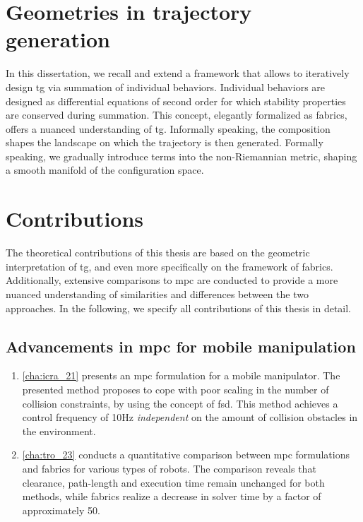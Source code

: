 \section{Geometries in trajectory generation}
\label{sec:geometries_in_trajectory_generation}

In this dissertation, we recall and extend a framework
that allows to iteratively design \ac{tg} via
summation of individual behaviors. Individual behaviors are
designed as differential equations of second order for which
stability properties are conserved during summation.
This concept, elegantly formalized as \ac{fabrics}, offers
a nuanced understanding of \ac{tg}.
Informally speaking, the composition shapes the
landscape on which the trajectory is then generated.
Formally speaking, we gradually introduce terms into the
non-Riemannian metric, shaping a smooth manifold of the
configuration space.

\section{Contributions}
\label{sec:contributions}
%
The theoretical contributions of this thesis
are based on the geometric interpretation of \ac{tg}, and
even more specifically on the framework of \ac{fabrics}.
Additionally, extensive
comparisons to \ac{mpc} are conducted to
provide a more nuanced understanding of similarities and
differences between the two approaches. In the following, we
specify all contributions of this thesis in detail.
%
\subsection{Advancements in \ac{mpc} for mobile manipulation}
\begin{enumerate}
    \item \cref{cha:icra_21} presents an \ac{mpc} formulation for a
      mobile manipulator. The presented method proposes to cope
      with poor scaling in the number of collision constraints, by
      using the concept of \acf{fsd}. This method achieves a
      control frequency of 10Hz \textit{independent} on the amount
      of collision obstacles in the environment.
    \item \cref{cha:tro_23} conducts a quantitative comparison between \ac{mpc}
      formulations and \ac{fabrics} for various types of
      robots. The comparison reveals that clearance,
      path-length and execution time remain unchanged for
      both methods, while \ac{fabrics} realize a decrease in
      solver time by a factor of approximately 50.
\end{enumerate}

